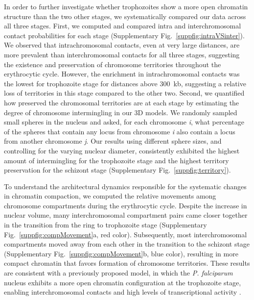 In order to further investigate whether trophozoites show a more open chromatin structure than the two other stages, we systematically compared our data across all three stages. First, we computed and compared intra and interchromosomal contact probabilities for each stage (Supplementary Fig.~\ref*{suppfig:intraVSinter}). We observed that intrachromosomal contacts, even at very large distances, are more prevalent than interchromosomal contacts for all three stages, suggesting the existence and preservation of chromosome territories throughout the erythrocytic cycle. However, the enrichment in intrachromosomal contacts was the lowest for trophozoite stage for distances above 300~kb, suggesting a relative loss of territories in this stage compared to the other two. Second, we quantified how preserved the chromosomal territories are at each stage by estimating the degree of chromosome intermingling in our 3D models. We randomly sampled small spheres in the nucleus and asked, for each chromosome {\em i}, what percentage of the spheres that contain any locus from chromosome {\em i} also contain a locus from another chromosome {\em j}. Our results using different sphere sizes, and controlling for the varying nuclear diameter, consistently exhibited the highest amount of intermingling for the trophozoite stage and the highest territory preservation for the schizont stage (Supplementary Fig.~\ref*{suppfig:territory}).

To understand the architectural dynamics responsible for the systematic changes in chromatin compaction, we computed the relative movements among chromosome compartments during the erythrocytic cycle. Despite the increase in nuclear volume, many interchromosomal compartment pairs came closer together in the transition from the ring to trophozoite stage (Supplementary Fig.~\ref*{suppfig:compMovement}a, red color). Subsequently, most interchromosomal compartments moved away from each other in the transition to the schizont stage (Supplementary Fig.~\ref*{suppfig:compMovement}b, blue color), resulting in more compact chromatin that favors formation of chromosome territories. These results are consistent with a previously proposed model, in which the {\em P. falciparum} nucleus exhibits a more open chromatin configuration at the trophozoite stage, enabling interchromosomal contacts and high levels of transcriptional activity \citep{ponts:nucleosome}.

